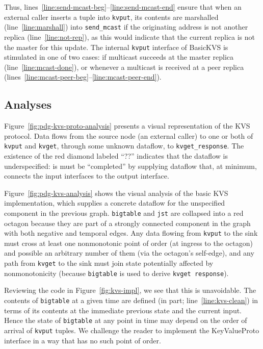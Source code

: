 Thus, lines~\ref{line:send-mcast-beg}--\ref{line:send-mcast-end} ensure that when an external caller inserts a tuple into
\texttt{kvput}, its contents are marshalled (line~\ref{line:marshall}) into \texttt{send\_mcast}
if the originating address is not another replica (line~\ref{line:not-rep}), as this would indicate
that the current replica is not the master for this update.  
The internal
\texttt{kvput} interface of BasicKVS is stimulated in one of two cases: if multicast succeeds
at the master replica (line~\ref{line:mcast-done}), or whenever a multicast is received at 
a peer replica (lines~\ref{line:mcast-peer-beg}--\ref{line:mcast-peer-end}).

\subsection{Analyses}
Figure~\ref{fig:pdg-kvs-proto-analysis} presents a visual representation of the KVS protocol.  Data
flows from the source node (an external caller) to one or both of \texttt{kvput} and 
\texttt{kvget}, through some unknown dataflow, to \texttt{kvget\_response}.
The existence of the red diamond labeled ``??'' indicates that the dataflow is underspecified:
is must be ``completed'' by supplying dataflow that, at minimum, connects the input 
interfaces to the output interface.

Figure~\ref{fig:pdg-kvs-analysis} shows the visual analysis of the basic KVS implementation,
which supplies a concrete dataflow for the unspecified component in the previous
graph.  \texttt{bigtable} and \texttt{jst} are collapsed into a red octagon because they
are part of a strongly connected component in the graph with both negative and temporal 
edges.  Any data flowing from \texttt{kvput} to the sink must cross at least one nonmonotonic
point of
order (at ingress to the octagon) and possible an arbitrary number of them (via the
octagon's self-edge), and any path from \texttt{kvget} to the sink must join state potentially
affected by nonmonotonicity (because \texttt{bigtable} is used to derive \texttt{kvget response}).

Reviewing the code in Figure~\ref{fig:kvs-impl}, we see that this is unavoidable.  The 
contents of \texttt{bigtable} at a given time are defined (in part; line~\ref{line:kvs-clean}) in terms
of its contents at the immediate previous state and the current input.  Hence the state
of \texttt{bigtable} at any point in time may depend on the order of arrival of \texttt{kvput} 
tuples.  We challenge the reader to implement the KeyValueProto interface in a way that
has no such point of order.

